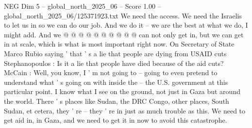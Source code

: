 \begin{textsample}{NEG Dim 5 – global\_north\_2025\_06 – Score 1.00 – global\_north\_2025\_06/125371923.txt}
We need the access.
We need the Israelis to let us in so we can do our job.
And we do it -- we are the best at what we do, I might add.
And we @ @ @ @ @ @ @ @ @ @ can not only get in, but we can get in at scale, which is what is most important right now.
On Secretary of State Marco Rubio saying ' that ' s a lie that people are dying from USAID cuts Stephanopoulos : Is it a lie that people have died because of the aid cuts?
McCain : Well, you know, I ' m not going to -- going to even pretend to understand what ' s going on with inside the -- the U.S. government at this particular point.
I know what I see on the ground, not just in Gaza but around the world.
There ' s places like Sudan, the DRC Congo, other places, South Sudan, et cetera, they ' re -- they ' re in just as much trouble as this.
We need to get aid in, in Gaza, and we need to get it in now to avoid this catastrophe.

\end{textsample}

